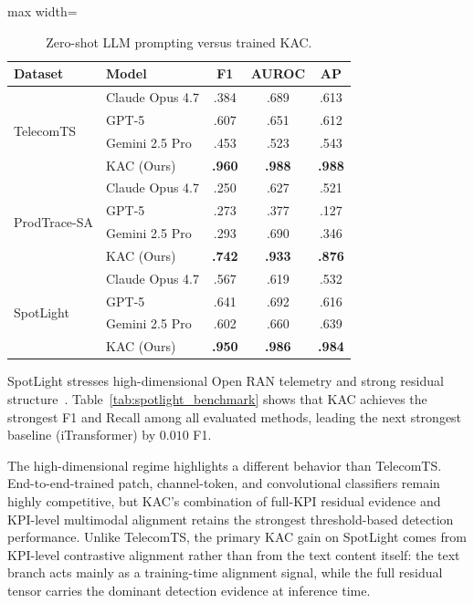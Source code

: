 \documentclass[conference]{IEEEtran}
\begin{document}
\begin{table}[t]
  \centering
  \caption{Zero-shot LLM prompting versus trained KAC.}
  \label{tab:llm_benchmark}
  \footnotesize
  \setlength{\tabcolsep}{7pt}
  \begin{adjustbox}{max width=\columnwidth}
  \begin{tabular}{@{}llccc@{}}
    \toprule
    \textbf{Dataset} & \textbf{Model} & \textbf{F1} & \textbf{AUROC} & \textbf{AP} \\
    \midrule
    \multirow{4}{*}{TelecomTS}
      & Claude Opus 4.7 & .384 & .689 & .613 \\
      & GPT-5           & .607 & .651 & .612 \\
      & Gemini 2.5 Pro  & .453 & .523 & .543 \\
      & KAC (Ours)      & \textbf{.960} & \textbf{.988} & \textbf{.988} \\
    \midrule
    \multirow{4}{*}{ProdTrace-SA}
      & Claude Opus 4.7 & .250 & .627 & .521 \\
      & GPT-5           & .273 & .377 & .127 \\
      & Gemini 2.5 Pro  & .293 & .690 & .346 \\
      & KAC (Ours)      & \textbf{.742} & \textbf{.933} & \textbf{.876} \\
    \midrule
    \multirow{4}{*}{SpotLight}
      & Claude Opus 4.7 & .567 & .619 & .532 \\
      & GPT-5           & .641 & .692 & .616 \\
      & Gemini 2.5 Pro  & .602 & .660 & .639 \\
      & KAC (Ours)      & \textbf{.950} & \textbf{.986} & \textbf{.984} \\
    \bottomrule
  \end{tabular}
  \end{adjustbox}
\end{table}

SpotLight stresses high-dimensional Open RAN telemetry and strong residual structure~\cite{sun2024spotlight}. Table~\ref{tab:spotlight_benchmark} shows that KAC achieves the strongest F1 and Recall among all evaluated methods, leading the next strongest baseline (iTransformer) by $0.010$ F1.

The high-dimensional regime highlights a different behavior than TelecomTS. End-to-end-trained patch, channel-token, and convolutional classifiers remain highly competitive, but KAC's combination of full-KPI residual evidence and KPI-level multimodal alignment retains the strongest threshold-based detection performance. Unlike TelecomTS, the primary KAC gain on SpotLight comes from KPI-level contrastive alignment rather than from the text content itself: the text branch acts mainly as a training-time alignment signal, while the full residual tensor carries the dominant detection evidence at inference time.
\end{document}

